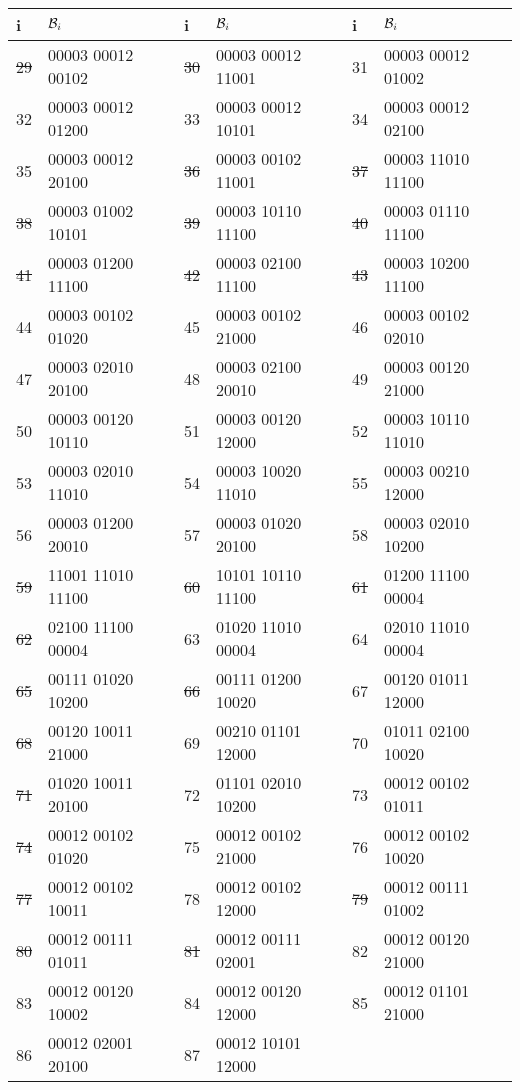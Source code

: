 \begin{tabular}{|l|l||l|l||l|l|}
\hline
 i & $\mathcal{B}_i$  &  i & $\mathcal{B}_i$  &  i & $\mathcal{B}_i$ \\\hline
\hline
\sout{29} &00003 00012 00102 &
\sout{30} &00003 00012 11001 &
{31} &00003 00012 01002 \\
{32} &00003 00012 01200 &
{33} &00003 00012 10101 &
{34} &00003 00012 02100 \\
{35} &00003 00012 20100 &
\sout{36} &00003 00102 11001 &
\sout{37} &00003 11010 11100 \\
\sout{38} &00003 01002 10101 &
\sout{39} &00003 10110 11100 &
\sout{40} &00003 01110 11100 \\
\sout{41} &00003 01200 11100 &
\sout{42} &00003 02100 11100 &
\sout{43} &00003 10200 11100 \\
{44} &00003 00102 01020 &
{45} &00003 00102 21000 &
{46} &00003 00102 02010 \\
{47} &00003 02010 20100 &
{48} &00003 02100 20010 &
{49} &00003 00120 21000 \\
{50} &00003 00120 10110 &
{51} &00003 00120 12000 &
{52} &00003 10110 11010 \\
{53} &00003 02010 11010 &
{54} &00003 10020 11010 &
{55} &00003 00210 12000 \\
{56} &00003 01200 20010 &
{57} &00003 01020 20100 &
{58} &00003 02010 10200 \\
\sout{59} &11001 11010 11100 &
\sout{60} &10101 10110 11100 &
\sout{61} &01200 11100 00004 \\
\sout{62} &02100 11100 00004 &
{63} &01020 11010 00004 &
{64} &02010 11010 00004 \\
\sout{65} &00111 01020 10200 &
\sout{66} &00111 01200 10020 &
{67} &00120 01011 12000 \\
\sout{68} &00120 10011 21000 &
{69} &00210 01101 12000 &
{70} &01011 02100 10020 \\
\sout{71} &01020 10011 20100 &
{72} &01101 02010 10200 &
{73} &00012 00102 01011 \\
\sout{74} &00012 00102 01020 &
{75} &00012 00102 21000 &
{76} &00012 00102 10020 \\
\sout{77} &00012 00102 10011 &
{78} &00012 00102 12000 &
\sout{79} &00012 00111 01002 \\
\sout{80} &00012 00111 01011 &
\sout{81} &00012 00111 02001 &
{82} &00012 00120 21000 \\
{83} &00012 00120 10002 &
{84} &00012 00120 12000 &
{85} &00012 01101 21000 \\
{86} &00012 02001 20100 &
{87} &00012 10101 12000 &

\end{tabular}
